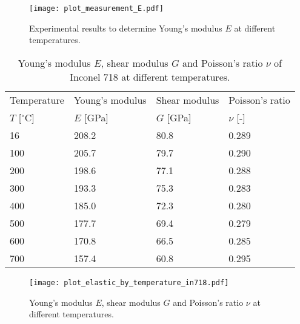 \begin{figure}[!htp]
\centering
\texttt{[image: plot\_measurement\_E.pdf]}
\caption{Experimental results to determine Young's modulus $E$ at different temperatures.}
\label{Fig:E_Test_Show}
\end{figure}

\begin{table}[htbp]
  \centering
  \caption{Young's modulus $E$, shear modulus $G$ and Poisson's ratio $\nu$ of Inconel 718 at different temperatures.}
    \begin{tabular}{p{3cm}<{\centering}p{3cm}<{\centering}p{3cm}<{\centering}p{3cm}<{\centering}}
    \toprule
    Temperature & Young's modulus & Shear modulus & Poisson's ratio \\
    $T$ [$^{\circ}$C] & $E$ [GPa] & $G$ [GPa] & $\nu$ [-] \\
    \midrule
    16    & 208.2  & 80.8  & 0.289 \\
    100   & 205.7  & 79.7  & 0.290 \\
    200   & 198.6  & 77.1  & 0.288 \\
    300   & 193.3  & 75.3  & 0.283 \\
    400   & 185.0  & 72.3  & 0.280 \\
    500   & 177.7  & 69.4  & 0.279 \\
    600   & 170.8  & 66.5  & 0.285 \\
    700   & 157.4  & 60.8  & 0.295 \\
    \bottomrule
    \end{tabular}%
  \label{Tab:EandG}%
\end{table}%

\begin{figure}[!htp]
  \centering
  \texttt{[image: plot\_elastic\_by\_temperature\_in718.pdf]}
  \caption{Young's modulus $E$, shear modulus $G$ and Poisson's ratio $\nu$ at different temperatures.}
  \label{Fig:plot_elastic_by_temperature_in718}
\end{figure}

